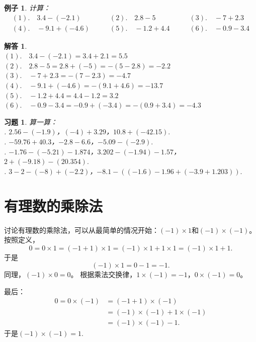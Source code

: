 \documentclass[12pt,UTF8]{ctexbook}
\newtheorem{ex}{例子}[section]
\newtheorem*{so}{解答}
\newtheorem{xt}{习题}[section]
\begin{document}
\begin{ex}
    计算：
    $$
    \begin{array}{lll}
        (1). \quad 3.4 - (-2.1) \quad & \quad (2). \quad 2.8 - 5 \quad & \quad (3). \quad -7 + 2.3 \\
        (4). \quad -9.1 + (-4.6) \quad & \quad (5). \quad -1.2 + 4.4 \quad & \quad (6). \quad -0.9 - 3.4
    \end{array}
    $$
\end{ex}
\begin{so}
    \mbox{}\\
    \indent $(1). \quad 3.4 - (-2.1) = 3.4 + 2.1 = 5.5$ \\
    \indent $(2). \quad 2.8 - 5 = 2.8 + (-5) = -(5 - 2.8) = -2.2$ \\
    \indent $(3). \quad -7 + 2.3 = -(7 - 2.3) = -4.7$ \\
    \indent $(4). \quad -9.1 + (-4.6) = -(9.1 + 4.6) = -13.7$ \\
    \indent $(5). \quad -1.2 + 4.4 = 4.4 - 1.2 = 3.2$ \\
    \indent $(6). \quad -0.9 - 3.4 = -0.9 + (-3.4) = -(0.9 + 3.4) = -4.3 $ 
\end{so}

\begin{xt}\label{xt:3-0-0}
    算一算：\\
    . $2.56 - (-1.9)$，$(-4) + 3.29$，$10.8 + (-42.15).$ \\
    . $-59.76 + 40.3$，$-2.8 - 6.6$，$-5.09 - (-2.9).$ \\
    . $-1.76 -(-5.21) - 1.874$，$3.202 - (-1.94) - 1.57$，$2 + (-9.18) - (20.354).$ \\
    . $3 - 2 - (-8) + (-2.2)$，$-8.1 - ((-1.6) - 1.96 + (-3.9 + 1.203)).$
\end{xt}

\section{有理数的乘除法}
讨论有理数的乘除法，可以从最简单的情况开始：$(-1) \times 1$和$(-1) \times (-1)$。按照定义，
$$0 = 0 \times 1 = (-1 + 1) \times 1 = (- 1) \times 1 + 1 \times 1 = (-1) \times 1 + 1.$$
于是
$$ (-1) \times 1 = 0 - 1 = -1.$$
同理，$(-1) \times 0 = 0$。
根据乘法交换律，$1 \times (-1) = -1$，$0 \times (-1) = 0$。

最后：
\begin{align*}
    0 = 0 \times (-1) &= (- 1 + 1) \times (-1)  \\
    &= (-1) \times (-1) + 1 \times (-1)  \\
    &= (-1) \times (-1) - 1. 
\end{align*}
于是$(-1) \times (-1) = 1.$
\end{document}
